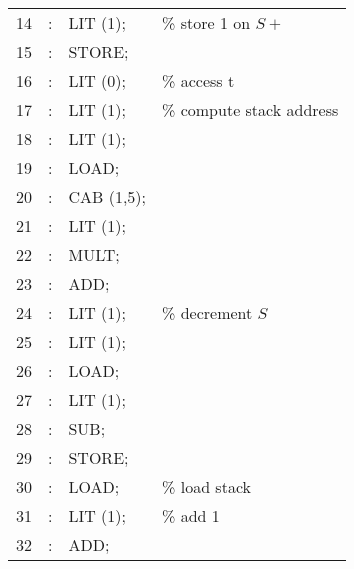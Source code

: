 \begin{solution}
\begin{enumerate}[(a)]
\begin{tabular}{rcll}
         14 & : \hspace{0.3cm} & LIT (1); &\% store 1 on $S+$\\
         15 & : \hspace{0.3cm} & STORE; &\\
         
         16 & : \hspace{0.3cm} & LIT (0); &\% access t \\ 
         
         17 & : \hspace{0.3cm} & LIT (1); &\% compute stack address\\
         18 & : \hspace{0.3cm} & LIT (1); &\\
         19 & : \hspace{0.3cm} & LOAD; &\\
         20 & : \hspace{0.3cm} & CAB (1,5); &\\
         21 & : \hspace{0.3cm} & LIT (1); &\\
         22 & : \hspace{0.3cm} & MULT; &\\
         23 & : \hspace{0.3cm} & ADD; &\\
        
         24 & : \hspace{0.3cm} & LIT (1); &\% decrement $S$\\
         25 & : \hspace{0.3cm} & LIT (1); &\\
         26 & : \hspace{0.3cm} & LOAD; &\\
         27 & : \hspace{0.3cm} & LIT (1); &\\
         28 & : \hspace{0.3cm} & SUB; &\\
         29 & : \hspace{0.3cm} & STORE; &\\
         
         30 & : \hspace{0.3cm} & LOAD; &\% load stack\\
         
         31 & : \hspace{0.3cm} & LIT (1); &\% add 1\\
         32 & : \hspace{0.3cm} & ADD; &\\
         

\end{tabular}
\end{enumerate}
\end{solution}
